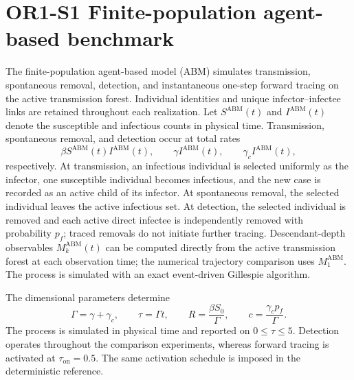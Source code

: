 \documentclass[11pt]{article}
\begin{document}
\section*{OR1-S1 Finite-population agent-based benchmark}
The finite-population agent-based model (ABM) simulates transmission, spontaneous removal, detection, and instantaneous one-step forward tracing on the active transmission forest. Individual identities and unique infector--infectee links are retained throughout each realization. Let $S^{\mathrm{ABM}}(t)$ and $I^{\mathrm{ABM}}(t)$ denote the susceptible and infectious counts in physical time. Transmission, spontaneous removal, and detection occur at total rates
\[
\beta S^{\mathrm{ABM}}(t)I^{\mathrm{ABM}}(t),\qquad
\gamma I^{\mathrm{ABM}}(t),\qquad
\gamma_c I^{\mathrm{ABM}}(t),
\]
respectively. At transmission, an infectious individual is selected uniformly as the infector, one susceptible individual becomes infectious, and the new case is recorded as an active child of its infector. At spontaneous removal, the selected individual leaves the active infectious set. At detection, the selected individual is removed and each active direct infectee is independently removed with probability $p_f$; traced removals do not initiate further tracing. Descendant-depth observables $M_k^{\mathrm{ABM}}(t)$ can be computed directly from the active transmission forest at each observation time; the numerical trajectory comparison uses $M_1^{\mathrm{ABM}}$. The process is simulated with an exact event-driven Gillespie algorithm.

The dimensional parameters determine
\[
\Gamma=\gamma+\gamma_c,\qquad
\tau=\Gamma t,\qquad
R=\frac{\beta S_0}{\Gamma},\qquad
c=\frac{\gamma_c p_f}{\Gamma}.
\]
The process is simulated in physical time and reported on $0\leq\tau\leq5$. Detection operates throughout the comparison experiments, whereas forward tracing is activated at $\tau_{\mathrm{on}}=0.5$. The same activation schedule is imposed in the deterministic reference.
\end{document}
